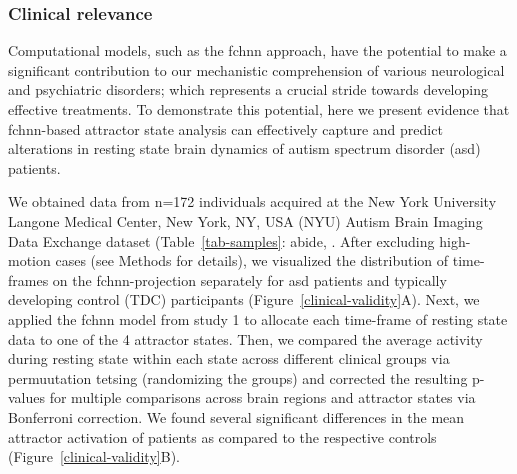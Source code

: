 \documentclass{article}
\begin{document}
\subsubsection{Clinical relevance}\label{Clinical relevance}

Computational models, such as the \acrshort{fchnn} approach, have the potential to make a significant contribution to our mechanistic comprehension of various neurological and psychiatric disorders; which represents a crucial stride towards developing effective treatments. To demonstrate this potential, here we present evidence that \acrshort{fchnn}-based attractor state analysis can effectively capture and predict alterations in resting state brain dynamics of autism spectrum disorder (\acrshort{asd}) patients.

We obtained data from n=172 individuals acquired at the New York University Langone Medical Center, New York, NY, USA (NYU) Autism Brain Imaging Data Exchange dataset (Table~\ref{tab-samples}: \acrshort{abide}, \citep{di2014autism}.
After excluding high-motion cases (see Methods for details), we visualized the distribution of time-frames on the \acrshort{fchnn}-projection separately for \acrshort{asd} patients and typically developing control (TDC) participants (Figure~\ref{clinical-validity}A).
Next, we applied the \acrshort{fchnn} model from study 1 to allocate each time-frame of resting state data to one of the 4 attractor states. Then, we compared the average activity during resting state within each state across different clinical groups via permuutation tetsing (randomizing the groups) and corrected the resulting p-values for multiple comparisons across brain regions and attractor states via Bonferroni correction. We found several significant differences in the mean attractor activation of patients as compared to the respective
controls (Figure~\ref{clinical-validity}B).
\end{document}
